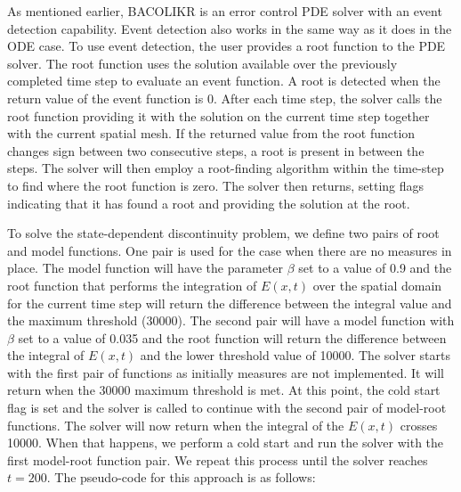 \documentclass{article}
\begin{document}
As mentioned earlier, BACOLIKR is an error control PDE solver with an event detection capability. Event detection also works in the same way as it does in the ODE case. To use event detection, the user provides a root function to the PDE solver. The root function uses the solution available over the previously completed time step to evaluate an event function. A root is detected when the return value of the event function is 0. After each time step, the solver calls the root function providing it with the solution on the current time step together with the current spatial mesh. If the returned value from the root function changes sign between two consecutive steps, a root is present in between the steps. The solver will then employ a root-finding algorithm within the time-step to find where the root function is zero. The solver then returns, setting flags indicating that it has found a root and providing the solution at the root. 

To solve the state-dependent discontinuity problem, we define two pairs of root and model functions. One pair is used for the case when there are no measures in place. The model function will have the parameter $\beta$ set to a value of 0.9 and the root function that performs the integration of $E(x, t)$ over the spatial domain for the current time step will return the difference between the integral value and the maximum threshold (30000). The second pair will have a model function with $\beta$ set to a value of 0.035 and the root function will return the difference between the integral of $E(x, t)$ and the lower threshold value of 10000. The solver starts with the first pair of functions as initially measures are not implemented. It will return when the 30000 maximum threshold is met. At this point, the cold start flag is set and the solver is called to continue with the second pair of model-root functions. The solver will now return when the integral of the $E(x, t)$ crosses 10000. When that happens, we perform a cold start and run the solver with the first model-root function pair. We repeat this process until the solver reaches $t=200$. The pseudo-code for this approach is as follows:
\end{document}
